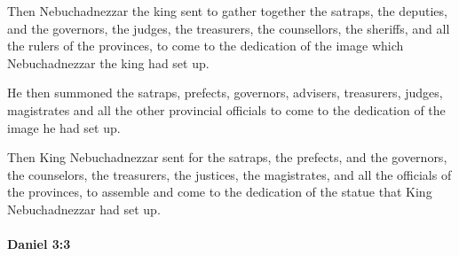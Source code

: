 			\begin{versebox}
					\item[BHS] 
					\item[LXX] 
					\item[ASV] Then Nebuchadnezzar the king sent to gather together the satraps, the deputies, and the governors, the judges, the treasurers, the counsellors, the sheriffs, and all the rulers of the provinces, to come to the dedication of the image which Nebuchadnezzar the king had set up.
					\item[NIV] He then summoned the satraps, prefects, governors, advisers, treasurers, judges, magistrates and all the other provincial officials to come to the dedication of the image he had set up.
					\item[NRSV] Then King Nebuchadnezzar sent for the satraps, the prefects, and the governors, the counselors, the treasurers, the justices, the magistrates, and all the officials of the provinces, to assemble and come to the dedication of the statue that King Nebuchadnezzar had set up.
			\end{versebox}

		\paragraph{Daniel 3:3} %
			\label{DANIEL-3-3}

